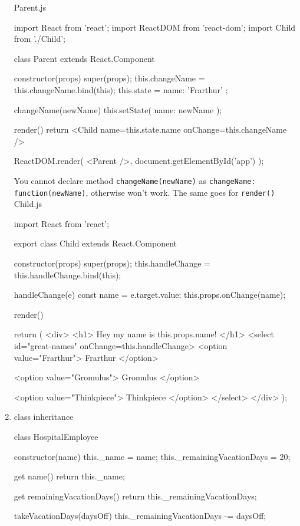 \documentclass[a4paper,12pt]{article}
\begin{document}
\begin{enumerate}
Parent.js
\begin{jscode}
import React from 'react';
import ReactDOM from 'react-dom';
import { Child } from './Child';

class Parent extends React.Component {
  constructor(props) {
    super(props);
    this.changeName = this.changeName.bind(this);
    this.state = { name: 'Frarthur' };
  }
  
  changeName(newName) {
    this.setState({ name: newName });
  }

  render() {
    return <Child name={this.state.name} onChange={this.changeName} />
  }
}

ReactDOM.render(
	<Parent />,
	document.getElementById('app')
);
\end{jscode}
You cannot declare method \verb|changeName(newName)| as \verb|changeName: function(newName)|, otherwise won't work. The same goes for \verb|render()|\\


Child.js
\begin{jscode}
import React from 'react';

export class Child extends React.Component {
  constructor(props) {
    super(props);
    this.handleChange = this.handleChange.bind(this);
  }
  
  handleChange(e) {
    const name = e.target.value;
    this.props.onChange(name);
  }
  
  render() {
    return (
      <div>
        <h1>
          Hey my name is {this.props.name}!
        </h1>
        <select id="great-names" onChange={this.handleChange}>
          <option value="Frarthur">
            Frarthur
          </option>

          <option value="Gromulus">
            Gromulus
          </option>

          <option value="Thinkpiece">
            Thinkpiece
          </option>
        </select>
      </div>
    );
  }
}
\end{jscode}


\item class inheritance
\begin{jscode}
class HospitalEmployee {
  constructor(name) {
    this._name = name;
    this._remainingVacationDays = 20;
  }
  
  get name() {
    return this._name;
  }
  
  get remainingVacationDays() {
    return this._remainingVacationDays;
  }
  
  takeVacationDays(daysOff) {
    this._remainingVacationDays -= daysOff;
  }
}


\end{jscode}
\end{enumerate}
\end{document}
